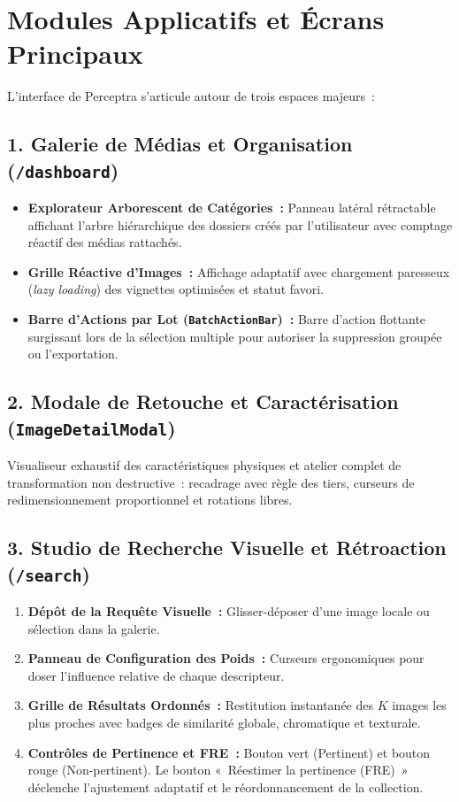 \section{Modules Applicatifs et Écrans Principaux}

L'interface de Perceptra s'articule autour de trois espaces majeurs~:

\subsection{1. Galerie de Médias et Organisation (\texttt{/dashboard})}
\begin{itemize}
    \item \textbf{Explorateur Arborescent de Catégories~:} Panneau latéral rétractable affichant l'arbre hiérarchique des dossiers créés par l'utilisateur avec comptage réactif des médias rattachés.
    \item \textbf{Grille Réactive d'Images~:} Affichage adaptatif avec chargement paresseux (\textit{lazy loading}) des vignettes optimisées et statut favori.
    \item \textbf{Barre d'Actions par Lot (\texttt{BatchActionBar})~:} Barre d'action flottante surgissant lors de la sélection multiple pour autoriser la suppression groupée ou l'exportation.
\end{itemize}

\subsection{2. Modale de Retouche et Caractérisation (\texttt{ImageDetailModal})}
Visualiseur exhaustif des caractéristiques physiques et atelier complet de transformation non destructive~: recadrage avec règle des tiers, curseurs de redimensionnement proportionnel et rotations libres.

\subsection{3. Studio de Recherche Visuelle et Rétroaction (\texttt{/search})}
\begin{enumerate}
    \item \textbf{Dépôt de la Requête Visuelle~:} Glisser-déposer d'une image locale ou sélection dans la galerie.
    \item \textbf{Panneau de Configuration des Poids~:} Curseurs ergonomiques pour doser l'influence relative de chaque descripteur.
    \item \textbf{Grille de Résultats Ordonnés~:} Restitution instantanée des $K$ images les plus proches avec badges de similarité globale, chromatique et texturale.
    \item \textbf{Contrôles de Pertinence et FRE~:} Bouton vert (Pertinent) et bouton rouge (Non-pertinent). Le bouton «~Réestimer la pertinence (FRE)~» déclenche l'ajustement adaptatif et le réordonnancement de la collection.
\end{enumerate}

